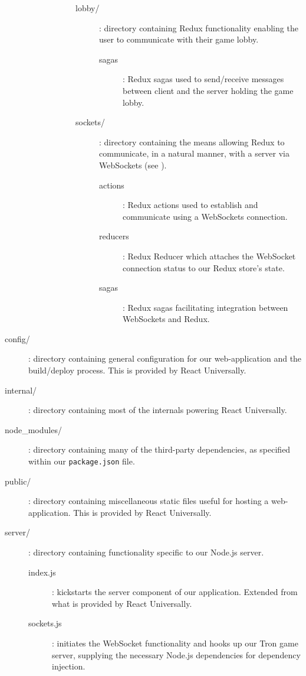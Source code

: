 \documentclass{standalone}
\begin{document}
\begin{formal}
\begin{description}
\begin{description}
\begin{description}
\begin{description}
			        	\item[lobby/]: directory containing Redux functionality enabling the user to communicate with their game lobby.
		      			\begin{description}
			        		\item[sagas]: Redux sagas used to send/receive messages between client and the server holding the game lobby.
		      			\end{description}

			        	\item[sockets/]: directory containing the means allowing Redux to communicate, in a natural manner, with a server via WebSockets (see ).
		      			\begin{description}
			        	\item[actions]: Redux actions used to establish and communicate using a WebSockets connection.
			        	\item[reducers]: Redux Reducer which attaches the WebSocket connection status to our Redux store's state.
			        	\item[sagas]: Redux sagas facilitating integration between WebSockets and Redux. 
		      			\end{description}
		      		\end{description}
	      		\end{description}
	      	\end{description}

	        \item[config/]: directory containing general configuration for our web-application and the build/deploy process. This is provided by React Universally.

	        \item[internal/]: directory containing most of the internals powering React Universally.

	      	\item[node\_modules/]: directory containing many of the third-party dependencies, as specified within our \texttt{package.json} file.

	      	\item[public/]: directory containing miscellaneous static files useful for hosting a web-application. This is provided by React Universally.

	      	\item[server/]: directory containing functionality specific to our Node.js server.
		        \begin{description}
		        	\item[index.js]: kickstarts the server component of our application. Extended from what is provided by React Universally.
		        	\item[sockets.js]: initiates the WebSocket functionality and hooks up our Tron game server, supplying the necessary Node.js dependencies for dependency injection.


\end{description}
\end{description}
\end{formal}
\end{document}
